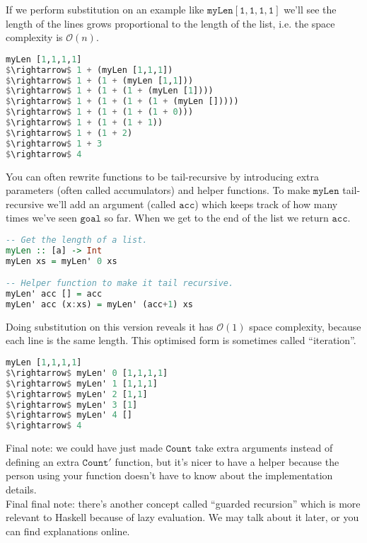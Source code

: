 \documentclass[a4paper,12pt]{article}
\newcommand{\keywadj}[1]{\mathtt{#1}}
\begin{document}
\noindent
If we perform substitution on an example like $\keywadj{myLen [1,1,1,1]}$ we'll see the length of the lines grows proportional to the length of the list, i.e. the space complexity is $\mathcal{O}(n)$.

\begin{lstlisting}[language=Haskell]
myLen [1,1,1,1]
$\rightarrow$ 1 + (myLen [1,1,1])
$\rightarrow$ 1 + (1 + (myLen [1,1]))
$\rightarrow$ 1 + (1 + (1 + (myLen [1])))
$\rightarrow$ 1 + (1 + (1 + (1 + (myLen []))))
$\rightarrow$ 1 + (1 + (1 + (1 + 0)))
$\rightarrow$ 1 + (1 + (1 + 1))
$\rightarrow$ 1 + (1 + 2)
$\rightarrow$ 1 + 3
$\rightarrow$ 4
\end{lstlisting}

\noindent
You can often rewrite functions to be tail-recursive by introducing extra parameters (often called accumulators) and helper functions. To make $\keywadj{myLen}$ tail-recursive we'll add an argument (called $\keywadj{acc}$) which keeps track of how many times we've seen $\keywadj{goal}$ so far. When we get to the end of the list we return $\keywadj{acc}$.

\begin{lstlisting}[language=Haskell]
-- Get the length of a list.
myLen :: [a] -> Int
myLen xs = myLen' 0 xs

-- Helper function to make it tail recursive.
myLen' acc [] = acc
myLen' acc (x:xs) = myLen' (acc+1) xs
\end{lstlisting}

\noindent
Doing substitution on this version reveals it has $\mathcal{O}(1)$ space complexity, because each line is the same length. This optimised form is sometimes called ``iteration''.

\begin{lstlisting}[language=Haskell]
myLen [1,1,1,1]
$\rightarrow$ myLen' 0 [1,1,1,1]
$\rightarrow$ myLen' 1 [1,1,1]
$\rightarrow$ myLen' 2 [1,1]
$\rightarrow$ myLen' 3 [1]
$\rightarrow$ myLen' 4 []
$\rightarrow$ 4
\end{lstlisting}

\noindent
Final note: we could have just made $\keywadj{Count}$ take extra arguments instead of defining an extra $\keywadj{Count'}$ function, but it's nicer to have a helper because the person using your function doesn't have to know about the implementation details. \\

\noindent
Final final note: there's another concept called ``guarded recursion'' which is more relevant to Haskell because of lazy evaluation. We may talk about it later, or you can find explanations online.
\end{document}
